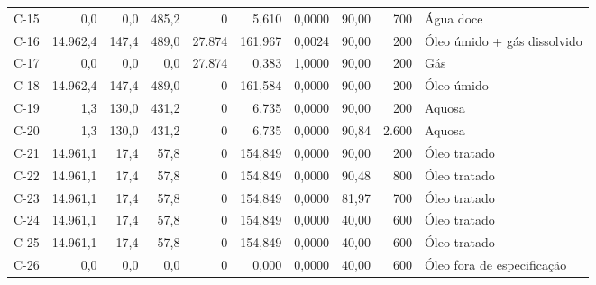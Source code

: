 \documentclass[11pt,a4paper]{article}
\numberwithin{equation}{section}
\numberwithin{table}{section}
\numberwithin{figure}{section}
\begin{document}
{\begin{longtable}{lrrrrrrrrL{2.5cm}}
C-15 & 0,0 & 0,0 & 485,2 & 0 & 5,610 & 0,0000 & 90,00 & 700 & {\scriptsize Água doce}\\
C-16 & 14.962,4 & 147,4 & 489,0 & 27.874 & 161,967 & 0,0024 & 90,00 & 200 & {\scriptsize Óleo úmido + gás dissolvido}\\
C-17 & 0,0 & 0,0 & 0,0 & 27.874 & 0,383 & 1,0000 & 90,00 & 200 & {\scriptsize Gás}\\
C-18 & 14.962,4 & 147,4 & 489,0 & 0 & 161,584 & 0,0000 & 90,00 & 200 & {\scriptsize Óleo úmido}\\
C-19 & 1,3 & 130,0 & 431,2 & 0 & 6,735 & 0,0000 & 90,00 & 200 & {\scriptsize Aquosa}\\
C-20 & 1,3 & 130,0 & 431,2 & 0 & 6,735 & 0,0000 & 90,84 & 2.600 & {\scriptsize Aquosa}\\
C-21 & 14.961,1 & 17,4 & 57,8 & 0 & 154,849 & 0,0000 & 90,00 & 200 & {\scriptsize Óleo tratado}\\
C-22 & 14.961,1 & 17,4 & 57,8 & 0 & 154,849 & 0,0000 & 90,48 & 800 & {\scriptsize Óleo tratado}\\
C-23 & 14.961,1 & 17,4 & 57,8 & 0 & 154,849 & 0,0000 & 81,97 & 700 & {\scriptsize Óleo tratado}\\
C-24 & 14.961,1 & 17,4 & 57,8 & 0 & 154,849 & 0,0000 & 40,00 & 600 & {\scriptsize Óleo tratado}\\
C-25 & 14.961,1 & 17,4 & 57,8 & 0 & 154,849 & 0,0000 & 40,00 & 600 & {\scriptsize Óleo tratado}\\
C-26 & 0,0 & 0,0 & 0,0 & 0 & 0,000 & 0,0000 & 40,00 & 600 & {\scriptsize Óleo fora de especificação}\\
\bottomrule\end{longtable}}
\end{document}

